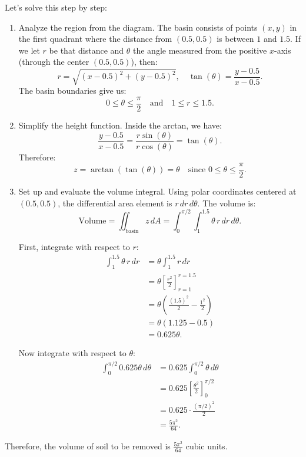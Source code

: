 \begin{example}
\begin{figure}[H]
\begin{tikzpicture}[scale=2]
\end{tikzpicture}
\end{figure}

\begin{solution}
Let's solve this step by step:

\begin{enumerate}
\item Analyze the region from the diagram. The basin consists of points $(x,y)$ in the first quadrant where the distance from $(0.5, 0.5)$ is between $1$ and $1.5$. If we let $r$ be that distance and $\theta$ the angle measured from the positive $x$-axis (through the center $(0.5, 0.5)$), then:
\[
r = \sqrt{(x - 0.5)^2 + (y - 0.5)^2}, 
\quad
\tan(\theta) = \frac{y - 0.5}{x - 0.5}.
\]
The basin boundaries give us:
\[
0 \leq \theta \leq \frac{\pi}{2}
\quad\text{and}\quad
1 \leq r \leq 1.5.
\]

\item Simplify the height function. Inside the arctan, we have:
\[
\frac{y - 0.5}{x - 0.5}
= \frac{r \sin(\theta)}{r \cos(\theta)}
= \tan(\theta).
\]
Therefore:
\[
z = \arctan(\tan(\theta)) = \theta
\quad
\text{since }0\leq \theta \leq \frac{\pi}{2}.
\]

\item Set up and evaluate the volume integral. Using polar coordinates centered at $(0.5,0.5)$, the differential area element is $r\,dr\,d\theta$. The volume is:
\[
\text{Volume} = \iint_{\text{basin}} z \, dA 
= \int_{0}^{\pi/2} \int_{1}^{1.5} \theta \,r \,dr\,d\theta.
\]

First, integrate with respect to $r$:
\begin{align*}
\int_{1}^{1.5} \theta \,r \,dr 
&= \theta \int_{1}^{1.5} r \,dr \\
&= \theta \left[\frac{r^2}{2}\right]_{r=1}^{r=1.5} \\
&= \theta\left(\frac{(1.5)^2}{2} - \frac{1^2}{2}\right) \\
&= \theta(1.125 - 0.5) \\
&= 0.625\theta.
\end{align*}

Now integrate with respect to $\theta$:
\begin{align*}
\int_{0}^{\pi/2} 0.625\theta \,d\theta 
&= 0.625 \int_{0}^{\pi/2} \theta \,d\theta \\
&= 0.625 \left[\frac{\theta^2}{2}\right]_{0}^{\pi/2} \\
&= 0.625 \cdot \frac{(\pi/2)^2}{2} \\
&= \frac{5\pi^2}{64}.
\end{align*}
\end{enumerate}

Therefore, the volume of soil to be removed is $\frac{5\pi^2}{64}$ cubic units.
\end{solution}


\end{example}


